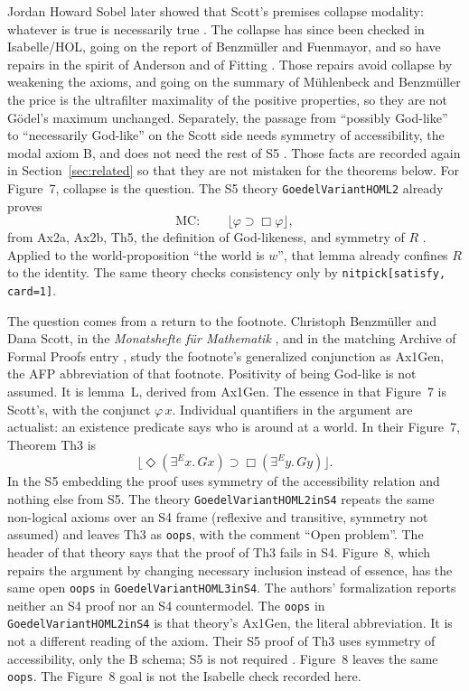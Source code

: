 \documentclass[11pt,a4paper]{article}
\newcommand{\valid}[1]{\lfloor #1 \rfloor}
\newcommand{\Nec}{\Box}
\newcommand{\Pos}{\Diamond}
\newcommand{\exE}{\exists^{E}}
\newcommand{\lean}[1]{\texttt{#1}}
\theoremstyle{definition}
\theoremstyle{remark}
\begin{document}
Jordan Howard Sobel later showed that Scott's premises collapse modality:
whatever is true is necessarily true \cite{sobel1987,sobel2004}.
The collapse has since been checked in Isabelle/HOL, going on the report of
Benzm\"uller and Fuenmayor, and so have repairs in the
spirit of Anderson and of Fitting
\cite{anderson1990,fitting2002,benzmuellerFuenmayor2020}.
Those repairs avoid collapse by weakening the axioms, and going on the
summary of M\"uhlenbeck and Benzm\"uller \cite{muehlenbeckBenzmueller2026}
the price is the ultrafilter maximality of the positive properties, so they
are not G\"odel's maximum unchanged.
Separately, the passage from ``possibly God-like'' to ``necessarily
God-like'' on the Scott side needs symmetry of accessibility, the modal axiom
B, and does not need the rest of S5 \cite{kanckos2017}.
Those facts are recorded again in Section~\ref{sec:related} so that they are
not mistaken for the theorems below.
For Figure~7, collapse is the question.
The S5 theory \lean{GoedelVariantHOML2} already proves
\[
  \mathrm{MC}:\qquad \valid{\varphi \supset \Nec\varphi},
\]
from Ax2a, Ax2b, Th5, the definition of God-likeness, and symmetry of \(R\)
\cite{afpNotes2025}.
Applied to the world-proposition ``the world is \(w\)'', that lemma already
confines \(R\) to the identity.
The same theory checks consistency only by \lean{nitpick[satisfy, card=1]}.

The question comes from a return to the footnote.
Christoph Benzm\"uller and Dana Scott, in the \emph{Monatshefte f\"ur
Mathematik} \cite{benzmuellerScott2025}, and in the matching Archive of Formal
Proofs entry \cite{afpNotes2025}, study the footnote's generalized conjunction
as Ax1Gen, the AFP abbreviation of that footnote.
Positivity of being God-like is not assumed.
It is lemma~L, derived from Ax1Gen.
The essence in that Figure~7 is Scott's, with the conjunct \(\varphi\,x\).
Individual quantifiers in the argument are actualist: an existence predicate
says who is around at a world.
In their Figure~7, Theorem Th3 is
\[
  \valid{\Pos(\exE x.\, G x) \supset \Nec(\exE y.\, G y)}.
\]
In the S5 embedding the proof uses symmetry of the accessibility relation and
nothing else from S5.
The theory \lean{GoedelVariantHOML2inS4} repeats the same non-logical axioms
over an S4 frame (reflexive and transitive, symmetry not assumed) and leaves
Th3 as \lean{oops}, with the comment ``Open problem''.
The header of that theory says that the proof of Th3 fails in S4.
Figure~8, which repairs the argument by changing necessary inclusion instead
of essence, has the same open \lean{oops} in
\lean{GoedelVariantHOML3inS4}.
The authors' formalization reports neither an S4 proof nor an S4 countermodel.
The \lean{oops} in \lean{GoedelVariantHOML2inS4} is that theory's Ax1Gen, the
literal abbreviation.
It is not a different reading of the axiom.
Their S5 proof of Th3 uses symmetry of accessibility, only the B schema; S5
is not required
\cite{benzmuellerScott2025,afpNotes2025}.
Figure~8 leaves the same \lean{oops}.
The Figure~8 goal is not the Isabelle check recorded here.
\end{document}
